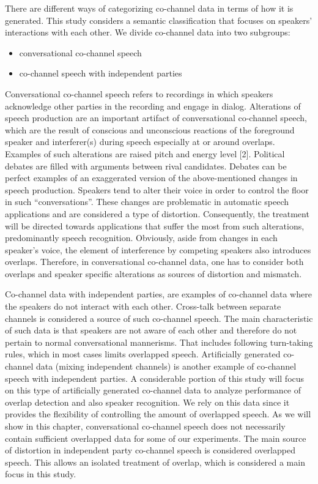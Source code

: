 There are different ways of categorizing co-channel data in terms of how it is generated. This study considers a semantic classification that focuses on speakers' interactions with each other. We divide co-channel data into two subgroups: 
\begin{itemize}
	\item conversational co-channel speech
	\item co-channel speech with independent parties
\end{itemize} 

Conversational co-channel speech refers to recordings in which speakers acknowledge other parties in the recording and engage in dialog. 
Alterations of speech production are an important artifact of conversational co-channel speech, which are the result of conscious and unconscious reactions of the foreground speaker and interferer(s) during speech especially at or around overlaps. 
Examples of such alterations are raised pitch and energy level [2]. 
Political debates are filled with arguments between rival candidates. 
Debates can be perfect examples of an exaggerated version of the above-mentioned changes in speech production. 
Speakers tend to alter their voice in order to control the floor in such ``conversations''. 
These changes are problematic in automatic speech applications and are considered a type of distortion. 
Consequently, the treatment will be directed towards applications that suffer the most from such alterations, predominantly speech recognition. 
Obviously, aside from changes in each speaker's voice, the element of interference by competing speakers also introduces overlaps. 
Therefore, in conversational co-channel data, one has to consider both overlaps and speaker specific alterations as sources of distortion and mismatch. 

Co-channel data with independent parties, are examples of co-channel data where the speakers do not interact with each other. 
Cross-talk between separate channels is considered a source of such co-channel speech. 
The main characteristic of such data is that speakers are not aware of each other and therefore do not pertain to normal conversational mannerisms. 
That includes following turn-taking rules, which in most cases limits overlapped speech. 
Artificially generated co-channel data (mixing independent channels) is another example of co-channel speech with independent parties. 
A considerable portion of this study will focus on this type of artificially generated co-channel data to analyze performance of overlap detection and also speaker recognition. 
We rely on this data since it provides the flexibility of controlling the amount of overlapped speech. 
As we will show in this chapter, conversational co-channel speech does not necessarily contain sufficient overlapped data for some of our experiments. 
The main source of distortion in independent party co-channel speech is considered overlapped speech. 
This allows an isolated treatment of overlap, which is considered a main focus in this study. 


